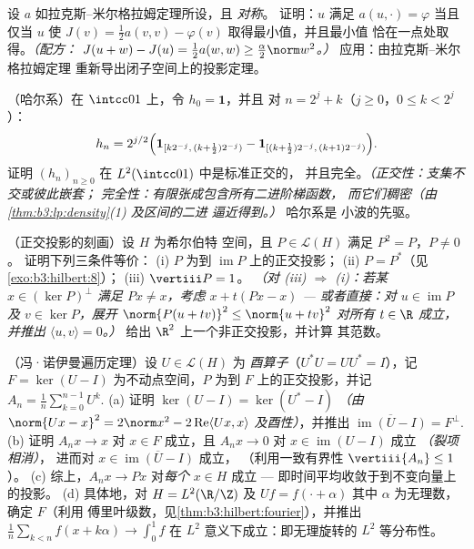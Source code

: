\begin{exercise}[$\star\star$]\label{exo:b3:hilbert:9}
设 $a$ 如拉克斯–米尔格拉姆定理所设，且 \emph{对称}。
证明：$u$ 满足 $a(u, \cdot) = \varphi$ 当且仅当 $u$ 使
$J(v) = \frac12a(v, v) - \varphi(v)$ 取得最小值，并且最小值
恰在一点处取得。\emph{（配方：
$J(u + w) - J(u) = \frac12a(w,w) \geq
\frac\alpha2\norm w^2$。）} 应用：由拉克斯–米尔格拉姆定理
重新导出闭子空间上的投影定理。
\end{exercise}

\begin{exercise}[$\star\star\star$]\label{exo:b3:hilbert:10}
（哈尔系）在 $\intcc01$ 上，令 $h_{0} = \mathbf 1$，并且
对 $n = 2^j + k$（$j \geq 0$，$0 \leq k < 2^j$）：
\[
h_n = 2^{j/2}\Bigl(\mathbf 1_{[k2^{-j},\,(k +
\frac12)2^{-j})} - \mathbf 1_{[(k+\frac12)2^{-j},\,(k+1)2^{-j})}
\Bigr).
\]
证明 $(h_n)_{n\geq0}$ 在 $L^2(\intcc01)$ 中是标准正交的，
并且完全。\emph{（正交性：支集不交或彼此嵌套；
完全性：有限张成包含所有二进阶梯函数，
而它们稠密（由 \cref{thm:b3:lp:density}(1) 及区间的二进
逼近得到。）} 哈尔系是
小波的先驱。
\end{exercise}

\begin{exercise}[$\star\star$]\label{exo:b3:hilbert:11}
（正交投影的刻画）设 $H$ 为希尔伯特
空间，且 $P \in \mathcal L(H)$ 满足 $P^2 = P$，$P \neq 0$。
证明下列三条件等价：
(i) $P$ 为到
$\operatorname{im}P$ 上的正交投影；
(ii) $P = P^*$（见\cref{exo:b3:hilbert:8}）；
(iii) $\vertiii P = 1$。
\emph{（对 (iii) $\Rightarrow$ (i)：若某 $x \in
(\ker P)^\perp$ 满足 $Px \neq x$，考虑 $x + t(Px - x)$
--- 或者直接：对 $u \in \operatorname{im}P$ 及 $v \in
\ker P$，展开 $\norm{P(u + tv)}^2 \leq \norm{u + tv}^2$
对所有 $t \in \R$ 成立，并推出 $\langle u, v\rangle = 0$。）}
给出 $\R^2$ 上一个非正交投影，并计算
其范数。
\end{exercise}

\begin{exercise}[$\star\star\star$]\label{exo:b3:hilbert:12}
（冯·诺伊曼遍历定理）设 $U \in \mathcal L(H)$ 为
\emph{酉算子}（$U^*U = UU^* = I$），记 $F = \ker(U - I)$
为不动点空间，$P$ 为到 $F$ 上的正交投影，并记
$A_n = \frac1n\sum_{k=0}^{n-1}U^k$.
(a) 证明 $\ker(U - I) = \ker(U^* - I)$ \emph{（由
$\norm{Ux - x}^2 = 2\norm x^2 - 2\operatorname{Re}\langle
Ux, x\rangle$ 及酉性）}，并推出
$\overline{\operatorname{im}(U - I)} = F^\perp$.
(b) 证明 $A_nx \to x$ 对 $x \in F$ 成立，且 $A_nx \to 0$
对 $x \in \operatorname{im}(U - I)$ 成立 \emph{（裂项相消）}，
进而对 $x \in \overline{\operatorname{im}(U - I)}$ 成立，
（利用一致有界性 $\vertiii{A_n} \leq 1$）。
(c) 综上，$A_nx \to Px$ 对\emph{每个} $x \in H$ 成立 ---
即时间平均收敛于到不变向量上的投影。
(d) 具体地，对 $H = L^2(\R/\Z)$ 及 $Uf = f(\cdot +
\alpha)$ 其中 $\alpha$ 为无理数，确定 $F$（利用
傅里叶级数，见\cref{thm:b3:hilbert:fourier}），并推出
$\frac1n\sum_{k<n}f(x + k\alpha) \to \int_0^1f$ 在
$L^2$ 意义下成立：即无理旋转的 $L^2$ 等分布性。
\end{exercise}

